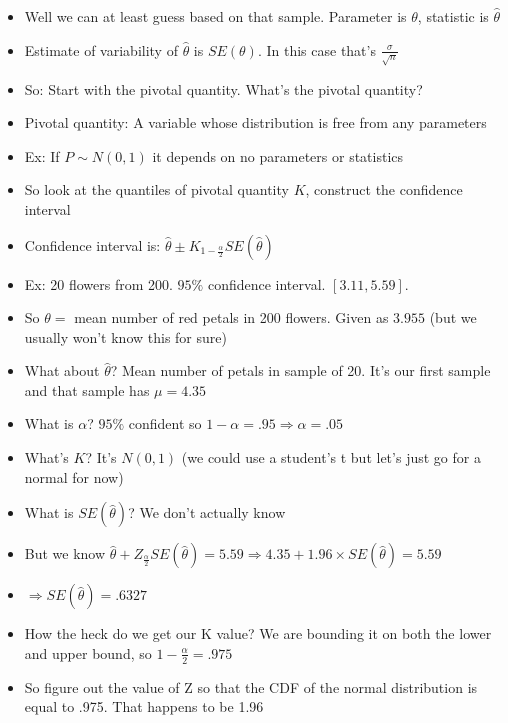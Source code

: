 \documentclass{article}
\begin{document}
\begin{itemize}
    \item Well we can at least guess based on that sample. Parameter is $ \theta $, statistic is $ \hat{\theta} $
    \item Estimate of variability of $  \hat{\theta} $ is $ SE(\theta) $. In this case that's  $ \frac{\sigma}{ \sqrt{ n }} $
    \item So: Start with the pivotal quantity. What's the pivotal quantity?
    \item Pivotal quantity: A variable whose distribution is free from any parameters
    \item Ex: If $ P \sim N(0, 1) $ it depends on no parameters or statistics
    \item So look at the quantiles of pivotal quantity $ K $, construct the confidence interval
    \item Confidence interval is: $ \hat{\theta} \pm K_{1 - \frac{\alpha}{2}} SE( \hat{\theta}) $
    \item Ex: 20 flowers from 200. $ 95\% $ confidence interval.  $ [3.11, 5.59] $. 
    \item So  $ \theta = $ mean number of red petals in 200 flowers. Given as $ 3.955 $ (but we usually won't know this for sure)
    \item What about $ \hat{\theta} $? Mean number of petals in sample of 20. It's our first sample and that sample has $ \mu = 4.35 $
    \item What is  $ \alpha $?  $ 95\% $ confident so  $ 1 - \alpha =.95 \Rightarrow \alpha =.05 $
    \item What's $ K $? It's $ N(0, 1) $ (we could use a student's t but let's just go for a normal for now)
    \item What is $ SE( \hat{\theta}) $? We don't actually know
    \item But we know $ \hat{\theta} + Z_{\frac{\alpha}{2}} SE( \hat{\theta}) = 5.59 \Rightarrow 4.35 + 1.96 \times SE( \hat{\theta}) = 5.59 $
      \item $ \Rightarrow SE ( \hat{\theta}) = .6327 $
      \item How the heck do we get our K value? We are bounding it on both the lower and upper bound, so $ 1 - \frac{\alpha}{2} = .975$
      \item So figure out the value of Z so that the CDF of the normal distribution is equal to .975. That happens to be 1.96


\end{itemize}
\end{document}
